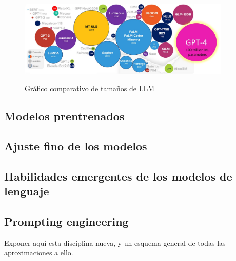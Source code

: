 \begin{figure}[]
    \caption{Gráfico comparativo de tamaños de LLM}
    \centering
    \includegraphics[width=0.9\textwidth]{./figuras/LLMs_sizes.png}
    \label{fig:llm_sizes}
\end{figure}

\subsection{Modelos prentrenados}
\subsection{Ajuste fino de los modelos}
\subsection{Habilidades emergentes de los modelos de lenguaje}
\subsection{Prompting engineering}
Exponer aquí esta disciplina nueva, y un esquema general de todas las aproximaciones a ello. \citep{LLMPromptingGuide}

